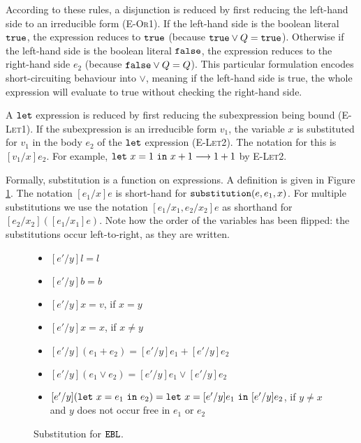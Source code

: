According to these rules, a disjunction is reduced by first reducing the left-hand side to an irreducible form (\textsc{E-Or1}). If the left-hand side is the boolean literal $\mathtt{true}$, the expression reduces to $\mathtt{true}$ (because $\mathtt{true} \lor Q = \mathtt{true}$). Otherwise if the left-hand side is the boolean literal $\mathtt{false}$, the expression reduces to the right-hand side $e_2$ (because $\mathtt{false} \lor Q = Q$). This particular formulation encodes short-circuiting behaviour into $\lor$, meaning if the left-hand side is true, the whole expression will evaluate to true without checking the right-hand side.

A $\mathtt{let}$ expression is reduced by first reducing the subexpression being bound (\textsc{E-Let1}). If the subexpression is an irreducible form $v_1$, the variable $x$ is substituted for $v_1$ in the body $e_2$ of the $\mathtt{let}$ expression (\textsc{E-Let2}). The notation for this is $[v_1/x]e_2$. For example, $\mathtt{let}~ x = 1~\mathtt{in}~ x+1 \longrightarrow 1+1$ by \textsc{E-Let2}.

Formally, substitution is a function on expressions. A definition is given in Figure \ref{fig:ebl_sub_defn}. The notation $[e_1/x]e$ is short-hand for $\mathtt{substitution}(e, e_1, x)$. For multiple substitutions we use the notation $[e_1/x_1, e_2/x_2] e$ as shorthand for $[e_2/x_2]([e_1/x_1] e)$. Note how the order of the variables has been flipped: the substitutions occur left-to-right, as they are written.

\begin{figure}[h]


\begin{itemize}
	\setlength\itemsep{-0.7em}
	\item[] $[e'/y]l = l$
	\item[] $[e'/y]b = b$ 
	\item[] $[e'/y]x =  v$, if $x = y$
	\item[] $[e'/y]x = x$, if $x \neq y$
	\item[] $[e'/y](e_1 + e_2) = [e'/y]e_1 + [e'/y]e_2$
	\item[] $[e'/y](e_1 \lor e_2) = [e'/y]e_1 \lor [e'/y]e_2$
	\item[] $[e'/y](\mathtt{let}~ x = e_1~\mathtt{in}~ e_2) = \mathtt{let}~ x = [e'/y]e_1~\mathtt{in}~ [e'/y]e_2$, if $y \neq x$ and $y$ does not occur free in $e_1$ or $e_2$
\end{itemize}

\vspace{-12pt}
\caption{Substitution for $\mathtt{EBL}$.}
\label{fig:ebl_sub_defn}
\end{figure}

